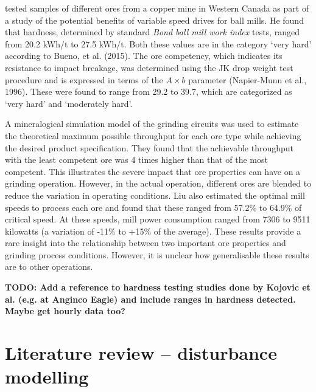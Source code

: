 \cite{liu_development_2018} tested samples of different ores from a copper mine in Western Canada as part of a study of the potential benefits of variable speed drives for ball mills. He found that hardness, determined by standard \textit{Bond ball mill work index} tests, ranged from 20.2 kWh/t to 27.5 kWh/t. Both these values are in the category `very hard' according to Bueno, et al. (2015). The ore competency, which indicates its resistance to impact breakage, was determined using the JK drop weight test procedure and is expressed in terms of the $A\times{b}$ parameter (Napier-Munn et al., 1996). These were found to range from 29.2 to 39.7, which are categorized as `very hard' and `moderately hard'.

A mineralogical simulation model of the grinding circuits was used to estimate the theoretical maximum possible throughput for each ore type while achieving the desired product specification. They found that the achievable throughput with the least competent ore was 4 times higher than that of the most competent. This illustrates the severe impact that ore properties can have on a grinding operation. However, in the actual operation, different ores are blended to reduce the variation in operating conditions. Liu also estimated the optimal mill speeds to process each ore and found that these ranged from 57.2\% to 64.9\% of critical speed. At these speeds, mill power consumption ranged from 7306 to 9511 kilowatts (a variation of -11\% to +15\% of the average). These results provide a rare insight into the relationship between two important ore properties and grinding process conditions. However, it is unclear how generalisable these results are to other operations.

\textbf{TODO: Add a reference to hardness testing studies done by Kojovic et al. (e.g. at Anginco Eagle) and include ranges in hardness detected.  Maybe get hourly data too?}


\section{Literature review – disturbance modelling}

